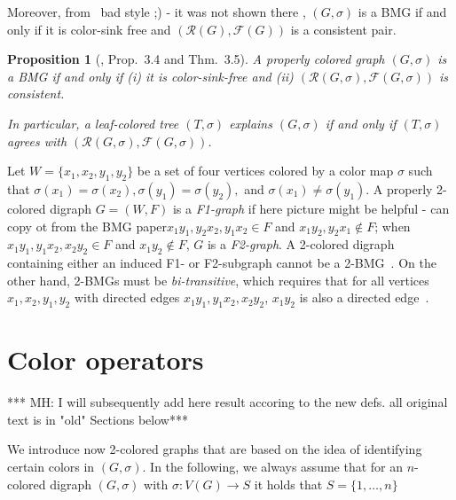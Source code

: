 \documentclass[final,3p,times]{elsarticle}
\newtheorem{proposition}[theorem]{Proposition}%
\newcommand{\TODO}[1]{\begingroup\color{red}#1\endgroup}
\newcommand{\OLD}[1]{\begingroup\tiny\color{gray}#1\endgroup}
\newcommand{\mh}[1]{\begingroup\color{blue}#1\endgroup}
\begin{document}
\OLD{
Moreover, from~\cite[Proposition~2.3]{korchmaros2021quasi} \TODO{bad style ;) - it was not shown there }, $(G,\sigma)$ is a BMG if and only if it is color-sink free and $(\mathscr{R}(G),\mathscr{F}(G))$ is a consistent pair. }

\mh{
\begin{proposition}[\cite{Schaller:21b}, Prop.~3.4 and Thm.~3.5]
  \label{prop:BMG-triple-charac}
  A properly colored graph $(G,\sigma)$ is a BMG if and only if (i) it is
  color-sink-free and (ii) $(\mathscr{R}(G,\sigma),\mathscr{F}(G,\sigma))$
  is consistent. 
  
  In particular, a leaf-colored tree $(T , \sigma)$  explains $(G, \sigma )$ 
  if and only if $(T , \sigma)$ agrees with $(\mathscr{R}(G,\sigma),\mathscr{F}(G,\sigma))$. 
\end{proposition}
}

Let $W=\{x_1,x_2,y_1,y_2\}$ be a set of four vertices colored by a color map $\sigma$ such that $\sigma(x_1)=\sigma(x_2),\sigma(y_1)=\sigma(y_2),$ and $\sigma(x_1)\neq \sigma(y_1)$. A properly 2-colored digraph $G=(W,F)$ is a \emph{F1-graph} if \TODO{here picture might be helpful - can copy ot from the BMG paper}$x_1y_1,y_2x_2,y_1x_2 \in F$ and $x_1 y_2,y_2x_1 \notin F$; when $x_1y_1,y_1x_2,x_2y_2 \in F$ and $x_1y_2 \notin F$, $G$ is a \emph{F2-graph}. A 2-colored digraph containing either an induced F1- or F2-subgraph cannot be a 2-BMG~\cite[Lemma 4.2]{schaller2021complexity}. On the other hand, 2-BMGs must be \emph{bi-transitive}, which requires that for all vertices $x_1, x_2, y_1, y_2$ with directed edges $x_1y_1, y_1x_2, x_2y_2$, $x_1y_2$ is also a directed edge~\cite{Korchmaros:21a}.

\section{Color operators}
\label{sec:operators}

\TODO{ *** MH: I will subsequently add here result accoring to the new defs. all
original text is in "old" Sections below***}


\mh{ We introduce now 2-colored graphs that are based on the idea of identifying
certain colors in $(G,\sigma)$. In the following, we always assume that 
for an $n$-colored digraph $(G,\sigma)$ with $\sigma\colon V(G) \to S$ 
it holds that $S = \{1,\dots,n\}$}
\end{document}
